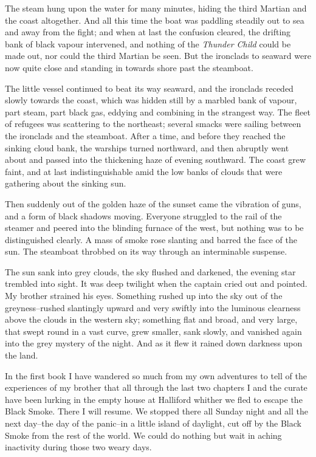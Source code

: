 The steam hung upon the water for many minutes, hiding the third
Martian and the coast altogether. And all this time the boat was
paddling steadily out to sea and away from the fight; and when at
last the confusion cleared, the drifting bank of black vapour
intervened, and nothing of the \emph{Thunder Child} could be made
out, nor could the third Martian be seen. But the ironclads to
seaward were now quite close and standing in towards shore past the
steamboat.

The little vessel continued to beat its way seaward, and the
ironclads receded slowly towards the coast, which was hidden still
by a marbled bank of vapour, part steam, part black gas, eddying
and combining in the strangest way. The fleet of refugees was
scattering to the northeast; several smacks were sailing between
the ironclads and the steamboat. After a time, and before they
reached the sinking cloud bank, the warships turned northward, and
then abruptly went about and passed into the thickening haze of
evening southward. The coast grew faint, and at last
indistinguishable amid the low banks of clouds that were gathering
about the sinking sun.

Then suddenly out of the golden haze of the sunset came the
vibration of guns, and a form of black shadows moving. Everyone
struggled to the rail of the steamer and peered into the blinding
furnace of the west, but nothing was to be distinguished clearly. A
mass of smoke rose slanting and barred the face of the sun. The
steamboat throbbed on its way through an interminable suspense.

The sun sank into grey clouds, the sky flushed and darkened, the
evening star trembled into sight. It was deep twilight when the
captain cried out and pointed. My brother strained his eyes.
Something rushed up into the sky out of the greyness--rushed
slantingly upward and very swiftly into the luminous clearness
above the clouds in the western sky; something flat and broad, and
very large, that swept round in a vast curve, grew smaller, sank
slowly, and vanished again into the grey mystery of the night. And
as it flew it rained down darkness upon the land.

In the first book I have wandered so much from my own adventures to
tell of the experiences of my brother that all through the last two
chapters I and the curate have been lurking in the empty house at
Halliford whither we fled to escape the Black Smoke. There I will
resume. We stopped there all Sunday night and all the next day--the
day of the panic--in a little island of daylight, cut off by the
Black Smoke from the rest of the world. We could do nothing but
wait in aching inactivity during those two weary days.

